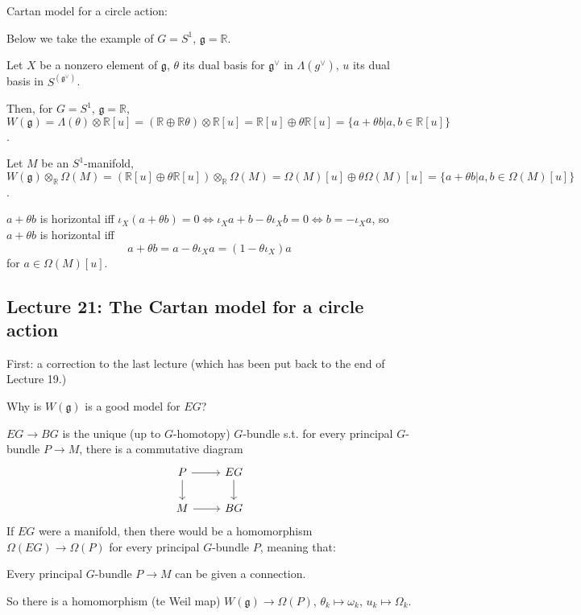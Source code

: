 \documentclass{article}
\theoremstyle{mystyle}
\theoremstyle{remark}
\numberwithin{equation}{section}
\begin{document}
Cartan model for a circle action:

Below we take the example of $G = S^1$, $\mathfrak{g} = \mathbb{R}$. 


Let $X$ be a nonzero element of $\mathfrak{g}$, $\theta$ its dual basis for $\mathfrak{g}^\vee$ in $\Lambda(g^\vee)$, $u$ its dual basis in $S^(\mathfrak{g}^\vee)$. 

Then, for $G = S^1$, $\mathfrak{g} = \mathbb{R}$, $W(\mathfrak{g}) = \Lambda(\theta)\otimes \mathbb{R}[u] = (\mathbb{R}\oplus \mathbb{R}\theta)\otimes \mathbb{R}[u]
= \mathbb{R}[u]\oplus \theta \mathbb{R}[u] = \{a+\theta b|a,b\in \mathbb{R}[u]\}$. 


Let $M$ be an $S^1$-manifold, $W(\mathfrak{g})\otimes_{\mathbb{R}} \Omega(M) = (\mathbb{R}[u]\oplus \theta \mathbb{R}[u])\otimes_{\mathbb{R}}\Omega(M) = \Omega(M)[u]\oplus \theta \Omega(M)[u]
= \{a+\theta b|a,b \in \Omega(M)[u]\}$. 

$a+\theta b$ is horizontal iff $\iota_X(a+\theta b) = 0\Leftrightarrow \iota_Xa + b -\theta\iota_X b = 0 \Leftrightarrow b= -\iota_X a$, so $a+\theta b$ is horizontal iff 
$$a+\theta b = a-\theta \iota_Xa 
= (1-\theta \iota_X)a$$ 
for $a \in \Omega(M)[u]$. 



\subsection{Lecture 21: The Cartan model for a circle action}

First: a correction to the last lecture (which has been put back to the end of Lecture 19.)

Why is $W(\mathfrak{g})$ is a good model for $EG$?

$EG\rightarrow BG$ is the unique (up to $G$-homotopy) $G$-bundle s.t. for every principal $G$-bundle $P\rightarrow M$, there is a commutative diagram
$$
\begin{tikzcd} P\ar[r]\ar[d] & EG \ar[d] \\ M\ar[r] & BG
\end{tikzcd}
$$
If $EG$ were a manifold, then there would be a homomorphism $\Omega(EG)\rightarrow \Omega(P)$ for every principal $G$-bundle $P$, meaning that:

Every principal $G$-bundle $P\rightarrow M$ can be given a connection.

So there is a homomorphism (te Weil map) $W(\mathfrak{g})\rightarrow \Omega(P)$, $\theta_k\mapsto \omega_k$, $u_k\mapsto \Omega_k$.
\end{document}

